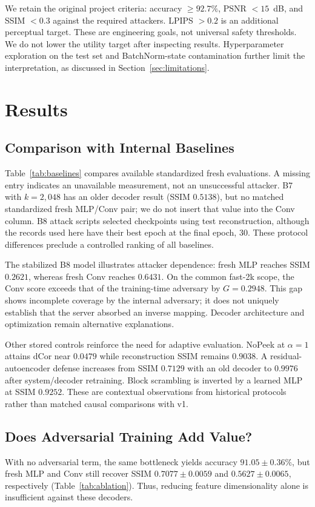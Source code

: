We retain the original project criteria: accuracy $\geq92.7\%$, PSNR $<15$~dB, and SSIM $<0.3$ against the required attackers. LPIPS $>0.2$ is an additional perceptual target. These are engineering goals, not universal safety thresholds. We do not lower the utility target after inspecting results. Hyperparameter exploration on the test set and BatchNorm-state contamination further limit the interpretation, as discussed in Section~\ref{sec:limitations}.

\section{Results}
\subsection{Comparison with Internal Baselines}

Table~\ref{tab:baselines} compares available standardized fresh evaluations. A missing entry indicates an unavailable measurement, not an unsuccessful attacker. B7 with $k=2{,}048$ has an older decoder result (SSIM $0.5138$), but no matched standardized fresh MLP/Conv pair; we do not insert that value into the Conv column. B8 attack scripts selected checkpoints using test reconstruction, although the records used here have their best epoch at the final epoch, 30. These protocol differences preclude a controlled ranking of all baselines.

The stabilized B8 model illustrates attacker dependence: fresh MLP reaches SSIM $0.2621$, whereas fresh Conv reaches $0.6431$. On the common fast-2k scope, the Conv score exceeds that of the training-time adversary by $G=0.2948$. This gap shows incomplete coverage by the internal adversary; it does not uniquely establish that the server absorbed an inverse mapping. Decoder architecture and optimization remain alternative explanations.

Other stored controls reinforce the need for adaptive evaluation. NoPeek at $\alpha=1$ attains dCor near $0.0479$ while reconstruction SSIM remains $0.9038$. A residual-autoencoder defense increases from SSIM $0.7129$ with an old decoder to $0.9976$ after system/decoder retraining. Block scrambling is inverted by a learned MLP at SSIM $0.9252$. These are contextual observations from historical protocols rather than matched causal comparisons with v1.

\subsection{Does Adversarial Training Add Value?}


With no adversarial term, the same bottleneck yields accuracy $91.05\pm0.36\%$, but fresh MLP and Conv still recover SSIM $0.7077\pm0.0059$ and $0.5627\pm0.0065$, respectively (Table~\ref{tab:ablation}). Thus, reducing feature dimensionality alone is insufficient against these decoders.

